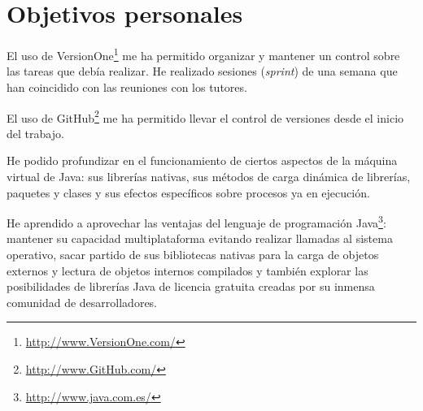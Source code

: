 \section{Objetivos personales}


El uso de VersionOne\footnote{\url{http://www.VersionOne.com/}} me ha permitido organizar y mantener un control sobre las tareas que debía realizar. He realizado sesiones (\textit{sprint}) de una semana que han coincidido con las reuniones con los tutores.

El uso de GitHub\footnote{\url{http://www.GitHub.com/}} me ha permitido llevar el control de versiones desde el inicio del trabajo.

He podido profundizar en el funcionamiento de ciertos aspectos de la máquina virtual de Java: sus librerías nativas, sus métodos de carga dinámica de librerías, paquetes y clases y sus efectos específicos sobre procesos ya en ejecución.

He aprendido a aprovechar las ventajas del lenguaje de programación Java\footnote{\url{http://www.java.com.es/}}: mantener su capacidad multiplataforma evitando realizar llamadas al sistema operativo, sacar partido de sus bibliotecas nativas para la carga de objetos externos y lectura de objetos internos compilados y también explorar las posibilidades de librerías Java de licencia gratuita creadas por su inmensa comunidad de desarrolladores.

